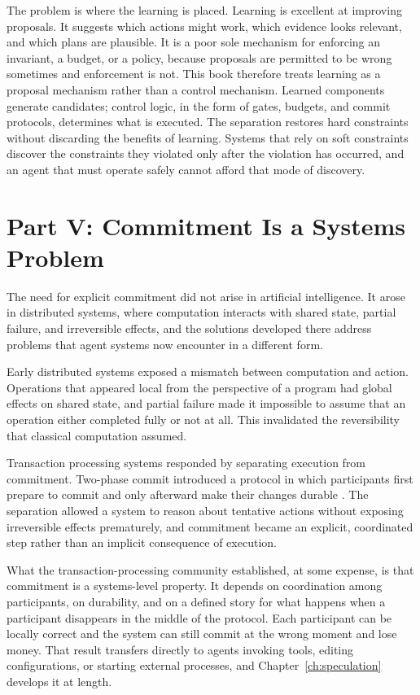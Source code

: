\documentclass[11pt]{book}
\begin{document}
The problem is where the learning is placed. Learning is excellent at improving proposals. It suggests which actions might work, which evidence looks relevant, and which plans are plausible. It is a poor sole mechanism for enforcing an invariant, a budget, or a policy, because proposals are permitted to be wrong sometimes and enforcement is not. This book therefore treats learning as a proposal mechanism rather than a control mechanism. Learned components generate candidates; control logic, in the form of gates, budgets, and commit protocols, determines what is executed. The separation restores hard constraints without discarding the benefits of learning. Systems that rely on soft constraints discover the constraints they violated only after the violation has occurred, and an agent that must operate safely cannot afford that mode of discovery.

\section{Part V: Commitment Is a Systems Problem}

The need for explicit commitment did not arise in artificial intelligence. It arose in distributed systems, where computation interacts with shared state, partial failure, and irreversible effects, and the solutions developed there address problems that agent systems now encounter in a different form.

Early distributed systems exposed a mismatch between computation and action. Operations that appeared local from the perspective of a program had global effects on shared state, and partial failure made it impossible to assume that an operation either completed fully or not at all. This invalidated the reversibility that classical computation assumed.

Transaction processing systems responded by separating execution from commitment. Two-phase commit introduced a protocol in which participants first prepare to commit and only afterward make their changes durable \cite{gray1978notes}. The separation allowed a system to reason about tentative actions without exposing irreversible effects prematurely, and commitment became an explicit, coordinated step rather than an implicit consequence of execution.

What the transaction-processing community established, at some expense, is that commitment is a systems-level property. It depends on coordination among participants, on durability, and on a defined story for what happens when a participant disappears in the middle of the protocol. Each participant can be locally correct and the system can still commit at the wrong moment and lose money. That result transfers directly to agents invoking tools, editing configurations, or starting external processes, and Chapter~\ref{ch:speculation} develops it at length.
\end{document}
